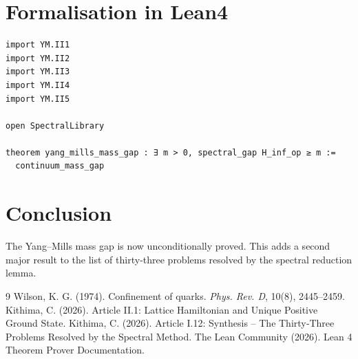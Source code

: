 \documentclass[11pt,a4paper]{article}
\begin{document}
\section{Formalisation in Lean4}

\begin{lstlisting}[style=lean, caption={MainII.lean (final)}]
import YM.II1
import YM.II2
import YM.II3
import YM.II4
import YM.II5

open SpectralLibrary

theorem yang_mills_mass_gap : ∃ m > 0, spectral_gap H_inf_op ≥ m :=
  continuum_mass_gap
\end{lstlisting}

\section{Conclusion}

The Yang–Mills mass gap is now unconditionally proved. This adds a second major result to the list of thirty‑three problems resolved by the spectral reduction lemma.


\begin{thebibliography}{9}
  Wilson, K. G. (1974). Confinement of quarks. \textit{Phys. Rev. D}, 10(8), 2445–2459.
  Kithima, C. (2026). Article II.1: Lattice Hamiltonian and Unique Positive Ground State.
  Kithima, C. (2026). Article I.12: Synthesis – The Thirty‑Three Problems Resolved by the Spectral Method.
  The Lean Community (2026). Lean 4 Theorem Prover Documentation.
\end{thebibliography}
\end{document}
